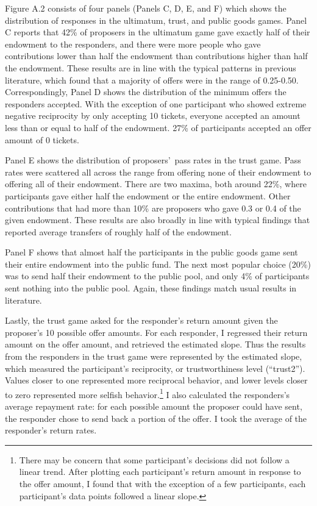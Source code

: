 \documentclass[12pt]{article}
\begin{document}
Figure A.2 consists of four panels (Panels C, D, E, and F) which shows the distribution of responses in the ultimatum, trust, and public goods games. Panel C reports that 42\% of proposers in the ultimatum game gave exactly half of their endowment to the responders, and there were more people who gave contributions lower than half the endowment than contributions higher than half the endowment. These results are in line with the typical patterns in previous literature, which found that a majority of offers were in the range of 0.25-0.50. Correspondingly, Panel D shows the distribution of the minimum offers the responders accepted. With the exception of one participant who showed extreme negative reciprocity by only accepting 10 tickets, everyone accepted an amount less than or equal to half of the endowment. 27\% of participants accepted an offer amount of 0 tickets. 

Panel E shows the distribution of proposers\rq \ pass rates in the trust game. Pass rates were scattered all across the range from offering none of their endowment to offering all of their endowment. There are two maxima, both around 22\%, where participants gave either half the endowment or the entire endowment. Other contributions that had more than 10\% are proposers who gave 0.3 or 0.4 of the given endowment. These results are also broadly in line with typical findings that reported average transfers of roughly half of the endowment.

Panel F shows that almost half the participants in the public goods game sent their entire endowment into the public fund. The next most popular choice (20\%) was to send half their endowment to the public pool, and only 4\% of participants sent nothing into the public pool. Again, these findings match usual results in literature.

Lastly, the trust game asked for the responder\rq s return amount given the proposer\rq s 10 possible offer amounts. For each responder, I regressed their return amount on the offer amount, and retrieved the estimated slope. Thus the results from the responders in the trust game were represented by the estimated slope, which measured the participant\rq s reciprocity, or trustworthiness level (``trust2''). Values closer to one represented more reciprocal behavior, and lower levels closer to zero represented more selfish behavior.\footnote{There may be concern that some participant\rq s decisions did not follow a linear trend. After plotting each participant\rq s return amount in response to the offer amount, I found that with the exception of a few participants, each participant\rq s data points followed a linear slope.} I also calculated the responders\rq s average repayment rate: for each possible amount the proposer could have sent, the responder chose to send back a portion of the offer. I took the average of the responder\rq s return rates.
\end{document}
